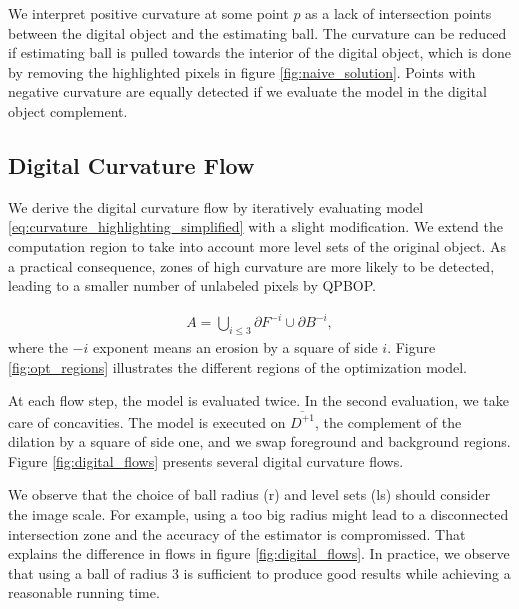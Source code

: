 \documentclass[runningheads]{llncs}
\begin{document}
We interpret positive curvature at some point $p$ as a lack of intersection points between the digital object and the estimating ball. The curvature can be reduced if estimating ball is pulled towards the interior of the digital object, which is done by removing the highlighted pixels in figure \ref{fig:naive_solution}. Points with negative curvature are equally detected if we evaluate the model in the digital object complement.

\subsection{Digital Curvature Flow}

We derive the digital curvature flow by iteratively evaluating  model \eqref{eq:curvature_highlighting_simplified} with a slight modification. We extend the computation region to take into account more level sets of the original object. As a practical consequence, zones of high curvature are more likely to be detected, leading to a smaller number of unlabeled pixels by QPBOP.

\begin{align*}
	A = \bigcup_{i\leq3}{ \partial F^{-i} \cup \partial B^{-i} },
\end{align*}
where the $-i$ exponent means an erosion by a square of side $i$. Figure \ref{fig:opt_regions} illustrates the different regions of the optimization model. 

At each flow step, the model is evaluated twice. In the second evaluation, we take care of concavities. The model is executed on $\overline{D^{+1}}$, the complement of the dilation by a square of side one, and we swap foreground and background regions. Figure \ref{fig:digital_flows} presents several digital curvature flows.

We observe that the choice of ball radius (r) and level sets (ls) should consider the image scale. For example, using a too big radius might lead to a disconnected intersection zone and the accuracy of the estimator is compromissed. That explains the difference in flows in figure \ref{fig:digital_flows}. In practice, we observe that using a ball of radius $3$ is sufficient to produce good results while achieving a reasonable running time.
\end{document}

